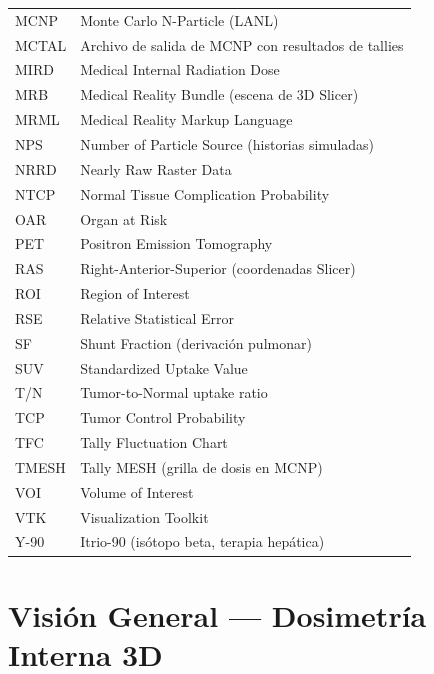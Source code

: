 \documentclass[12pt,a4paper]{article}
\begin{document}
\begin{longtable}{p{3.5cm} p{11cm}}
MCNP & Monte Carlo N-Particle (LANL) \\
MCTAL & Archivo de salida de MCNP con resultados de tallies \\
MIRD & Medical Internal Radiation Dose \\
MRB & Medical Reality Bundle (escena de 3D Slicer) \\
MRML & Medical Reality Markup Language \\
NPS & Number of Particle Source (historias simuladas) \\
NRRD & Nearly Raw Raster Data \\
NTCP & Normal Tissue Complication Probability \\
OAR & Organ at Risk \\
PET & Positron Emission Tomography \\
RAS & Right-Anterior-Superior (coordenadas Slicer) \\
ROI & Region of Interest \\
RSE & Relative Statistical Error \\
SF & Shunt Fraction (derivación pulmonar) \\
SUV & Standardized Uptake Value \\
T/N & Tumor-to-Normal uptake ratio \\
TCP & Tumor Control Probability \\
TFC & Tally Fluctuation Chart \\
TMESH & Tally MESH (grilla de dosis en MCNP) \\
VOI & Volume of Interest \\
VTK & Visualization Toolkit \\
Y-90 & Itrio-90 (isótopo beta, terapia hepática) \\
\end{longtable}

\newpage

\tableofcontents
\newpage

\section{Visión General --- Dosimetría Interna 3D}
\end{document}
